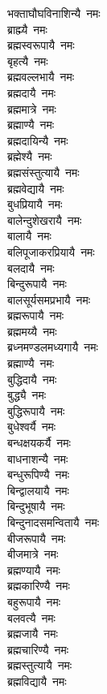 \begin{flushleft}
\begin{multicols}{2}
भक्ताघौघविनाशिन्यै~नमः\\
ब्राह्म्यै~नमः\\
ब्रह्मस्वरूपायै~नमः\\
बृहत्यै~नमः\\
ब्रह्मवल्लभायै~नमः\\
ब्रह्मदायै~नमः\\
ब्रह्ममात्रे~नमः\\
ब्रह्माण्यै~नमः\\
ब्रह्मदायिन्यै~नमः\hfill{}\\
ब्रह्मेश्यै~नमः\\
ब्रह्मसंस्तुत्यायै~नमः\\
ब्रह्मवेद्यायै~नमः\\
बुधप्रियायै~नमः\\
बालेन्दुशेखरायै~नमः\\
बालायै~नमः\\
बलिपूजाकरप्रियायै~नमः\\
बलदायै~नमः\\
बिन्दुरूपायै~नमः\\
बालसूर्यसमप्रभायै~नमः\hfill{}\\
ब्रह्मरूपायै~नमः\\
ब्रह्ममय्यै~नमः\\
ब्रध्नमण्डलमध्यगायै~नमः\\
ब्रह्माण्यै~नमः\\
बुद्धिदायै~नमः\\
बुद्ध्यै~नमः\\
बुद्धिरूपायै~नमः\\
बुधेश्वर्यै~नमः\\
बन्धक्षयकर्यै~नमः\\
बाधनाशन्यै~नमः\hfill{}\\
बन्धुरूपिण्यै~नमः\\
बिन्द्वालयायै~नमः\\
बिन्दुभूषायै~नमः\\
बिन्दुनादसमन्वितायै~नमः\\
बीजरूपायै~नमः\\
बीजमात्रे~नमः\\
ब्रह्मण्यायै~नमः\\
ब्रह्मकारिण्यै~नमः\\
बहुरूपायै~नमः\\
बलवत्यै~नमः\hfill{}\\
ब्रह्मजायै~नमः\\
ब्रह्मचारिण्यै~नमः\\
ब्रह्मस्तुत्यायै~नमः\\
ब्रह्मविद्यायै~नमः\\

\end{multicols}
\end{flushleft}
